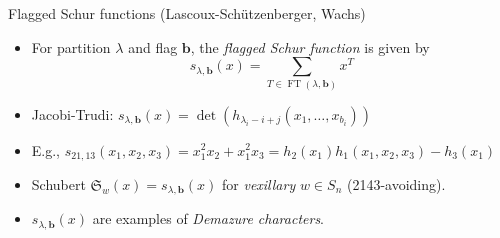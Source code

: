 \documentclass[dvipsnames]{beamer}
\DeclareMathOperator{\FT}{FT}
\newcommand{\bb}{{\mathbf b}}
\theoremstyle{definition}
\newcounter{c}
\begin{document}
\begin{frame}{Flagged Schur functions (Lascoux-Sch\"{u}tzenberger, Wachs)}
  \begin{itemize}
  \item For partition \(\lambda\) and flag \(\bb\), the \emph{flagged
      Schur function} is given by
    \[
      s_{\lambda,\bb}(x) = \sum_{T \in \FT(\lambda,\bb)} x^T
    \]\pause
  \item Jacobi-Trudi: \(s_{\lambda,\bb}(x) = \det(h_{\lambda_i-i+j}(x_1,\ldots,x_{b_i}))\)\pause
  \item E.g., \(s_{21,13}(x_1,x_2,x_3) = x_1^2x_2 + x_1^2 x_3 =
    h_2(x_1)h_1(x_1,x_2,x_3)-h_3(x_1)\) 
    \begin{center}
    \end{center}
    \pause
  \item Schubert \(\mathfrak{S}_w(x) = s_{\lambda,\bb}(x)\) for
    \emph{vexillary} \(w \in S_n\) (2143-avoiding).\pause
  \item \(s_{\lambda,\bb}(x)\) are examples of \emph{Demazure characters}.
  \end{itemize}
\end{frame}
\end{document}
